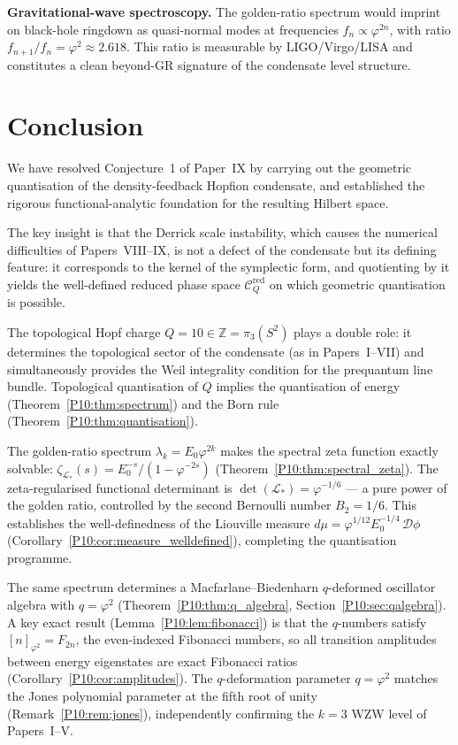 \documentclass[11pt,a4paper]{article}
\theoremstyle{definition}
\theoremstyle{remark}
\newcommand{\vp}{\varphi}
\newcommand{\ZZ}{\mathbb{Z}}
\newcommand{\CQr}{\mathcal{C}_Q^{\mathrm{red}}}
\newcommand{\dmu}{d\mu}
\begin{document}
\textbf{Gravitational-wave spectroscopy.}
The golden-ratio spectrum would imprint on black-hole ringdown as
quasi-normal modes at frequencies $f_n \propto \vp^{2n}$,
with ratio $f_{n+1}/f_n = \vp^2 \approx 2.618$.
This ratio is measurable by LIGO/Virgo/LISA and constitutes a
clean beyond-GR signature of the condensate level structure.


\section{Conclusion}
\label{P10:sec:conclusion}

We have resolved Conjecture~1 of Paper~IX by carrying out
the geometric quantisation of the density-feedback Hopfion condensate,
and established the rigorous functional-analytic foundation for the
resulting Hilbert space.

The key insight is that the Derrick scale instability, which causes
the numerical difficulties of Papers~VIII--IX, is not a defect of
the condensate but its defining feature: it corresponds to the
kernel of the symplectic form, and quotienting by it yields the
well-defined reduced phase space $\CQr$ on which geometric
quantisation is possible.

The topological Hopf charge $Q=10\in\ZZ=\pi_3(S^2)$ plays a
double role: it determines the topological sector of the condensate
(as in Papers~I--VII) and simultaneously provides the Weil
integrality condition for the prequantum line bundle.
Topological quantisation of $Q$ implies the quantisation of energy
(Theorem~\ref{P10:thm:spectrum}) and the Born rule
(Theorem~\ref{P10:thm:quantisation}).

The golden-ratio spectrum $\lambda_k = E_0\vp^{2k}$ makes the
spectral zeta function exactly solvable:
$\zeta_{\mathcal{L}_*}(s) = E_0^{-s}/(1-\vp^{-2s})$
(Theorem~\ref{P10:thm:spectral_zeta}).
The zeta-regularised functional determinant is
$\det(\mathcal{L}_*) = \vp^{-1/6}$ --- a pure power of the golden
ratio, controlled by the second Bernoulli number $B_2=1/6$.
This establishes the well-definedness of the Liouville measure
$\dmu = \vp^{1/12}E_0^{-1/4}\,\mathcal{D}\phi$
(Corollary~\ref{P10:cor:measure_welldefined}), completing the
quantisation programme.

The same spectrum determines a Macfarlane--Biedenharn $q$-deformed
oscillator algebra with $q=\vp^2$ (Theorem~\ref{P10:thm:q_algebra},
Section~\ref{P10:sec:qalgebra}).
A key exact result (Lemma~\ref{P10:lem:fibonacci}) is that the
$q$-numbers satisfy $[n]_{\vp^2} = F_{2n}$, the even-indexed
Fibonacci numbers, so all transition amplitudes between energy
eigenstates are exact Fibonacci ratios
(Corollary~\ref{P10:cor:amplitudes}).
The $q$-deformation parameter $q=\vp^2$ matches the Jones
polynomial parameter at the fifth root of unity (Remark~\ref{P10:rem:jones}),
independently confirming the $k=3$ WZW level of Papers~I--V.
\end{document}

